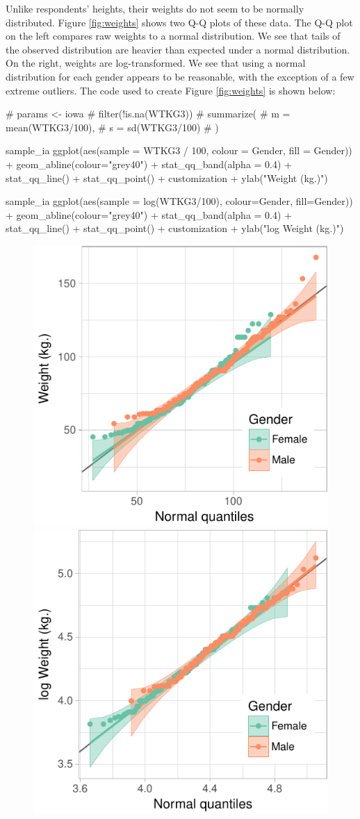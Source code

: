 Unlike respondents' heights, their weights do not seem to be normally
distributed. Figure \ref{fig:weights} shows two Q-Q plots of these data.
The Q-Q plot on the left compares raw weights to a normal distribution.
We see that tails of the observed distribution are heavier than expected
under a normal distribution. On the right, weights are log-transformed.
We see that using a normal distribution for each gender appears to be
reasonable, with the exception of a few extreme outliers. The code used
to create Figure \ref{fig:weights} is shown below:

\begin{Schunk}
\begin{Sinput}
# params <- iowa %
#   filter(!is.na(WTKG3)) %
#   summarize(
#     m = mean(WTKG3/100),
#     s = sd(WTKG3/100)
#   )

sample_ia %
  ggplot(aes(sample = WTKG3 / 100, colour = Gender, fill = Gender)) + 
  geom_abline(colour="grey40") +
  stat_qq_band(alpha = 0.4) + 
  stat_qq_line() + 
  stat_qq_point() +
  customization +
  ylab("Weight (kg.)")

sample_ia %
  ggplot(aes(sample = log(WTKG3/100), colour=Gender, fill=Gender)) + 
  geom_abline(colour="grey40") +
  stat_qq_band(alpha = 0.4) + 
  stat_qq_line() + 
  stat_qq_point() +
  customization +
  ylab("log Weight (kg.)")
\end{Sinput}
\begin{figure}

{\centering \includegraphics[width=0.4\linewidth]{loy-figures/weights-1} \includegraphics[width=0.4\linewidth]{loy-figures/weights-2} 

}
\end{figure}
\end{Schunk}
